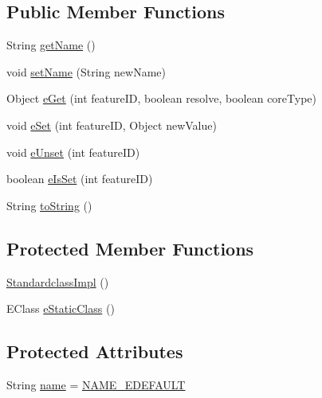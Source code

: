 \subsection*{Public Member Functions}
\begin{DoxyCompactItemize}
\item 
String \hyperlink{classshootingmachineemfmodel_1_1impl_1_1_standardclass_impl_adfab6dbafe989bbcb5310c704caa683b}{get\-Name} ()
\item 
void \hyperlink{classshootingmachineemfmodel_1_1impl_1_1_standardclass_impl_a651bebba7c5ff55c473e66bdcc603af4}{set\-Name} (String new\-Name)
\item 
Object \hyperlink{classshootingmachineemfmodel_1_1impl_1_1_standardclass_impl_ab0fe73b10038e1699b6f680315597551}{e\-Get} (int feature\-I\-D, boolean resolve, boolean core\-Type)
\item 
void \hyperlink{classshootingmachineemfmodel_1_1impl_1_1_standardclass_impl_a4eb8c1ddee4dc5e3f5a96c3341d94862}{e\-Set} (int feature\-I\-D, Object new\-Value)
\item 
void \hyperlink{classshootingmachineemfmodel_1_1impl_1_1_standardclass_impl_a742a10d3e6547ef1834e2383432069c5}{e\-Unset} (int feature\-I\-D)
\item 
boolean \hyperlink{classshootingmachineemfmodel_1_1impl_1_1_standardclass_impl_aa63e87b4bf386d61477d3359425c579f}{e\-Is\-Set} (int feature\-I\-D)
\item 
String \hyperlink{classshootingmachineemfmodel_1_1impl_1_1_standardclass_impl_af6d97dd696551a18885837d9b6ac5c30}{to\-String} ()
\end{DoxyCompactItemize}
\subsection*{Protected Member Functions}
\begin{DoxyCompactItemize}
\item 
\hyperlink{classshootingmachineemfmodel_1_1impl_1_1_standardclass_impl_a4fe70e5a67bb2a070fed88a552f4933e}{Standardclass\-Impl} ()
\item 
E\-Class \hyperlink{classshootingmachineemfmodel_1_1impl_1_1_standardclass_impl_aea12f45062e8de84aa1c6578d756fead}{e\-Static\-Class} ()
\end{DoxyCompactItemize}
\subsection*{Protected Attributes}
\begin{DoxyCompactItemize}
\item 
String \hyperlink{classshootingmachineemfmodel_1_1impl_1_1_standardclass_impl_a4f6c3a5c981880bce8b5042f582d5739}{name} = \hyperlink{classshootingmachineemfmodel_1_1impl_1_1_standardclass_impl_a9b5409548f5c6e9e0919e4dc6c0d0842}{N\-A\-M\-E\-\_\-\-E\-D\-E\-F\-A\-U\-L\-T}
\end{DoxyCompactItemize}
